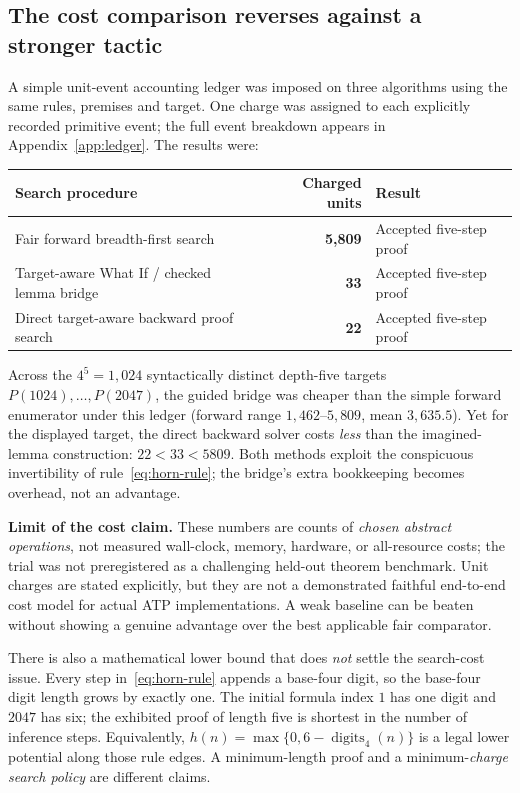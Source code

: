 \documentclass[11pt,letterpaper,oneside]{article}
\begin{document}
\subsection{The cost comparison reverses against a stronger tactic}
A simple unit-event accounting ledger was imposed on three algorithms using the same rules, premises and target. One charge was assigned to each explicitly recorded primitive event; the full event breakdown appears in Appendix~\ref{app:ledger}. The results were:
\begin{center}
\begin{tabularx}{.94\textwidth}{@{}Xr>{\raggedright\arraybackslash}p{2.2in}@{}}
\toprule
Search procedure & Charged units & Result\\\midrule
Fair forward breadth-first search & \textbf{5,809} & Accepted five-step proof\\
Target-aware What If / checked lemma bridge & \textbf{33} & Accepted five-step proof\\
Direct target-aware backward proof search & \textbf{22} & Accepted five-step proof\\\bottomrule
\end{tabularx}
\end{center}
Across the $4^5=1{,}024$ syntactically distinct depth-five targets $P(1024),\ldots,P(2047)$, the guided bridge was cheaper than the simple forward enumerator under this ledger (forward range $1{,}462$--$5{,}809$, mean $3{,}635.5$). Yet for the displayed target, the direct backward solver costs \emph{less} than the imagined-lemma construction: $22<33<5809$. Both methods exploit the conspicuous invertibility of rule~\eqref{eq:horn-rule}; the bridge's extra bookkeeping becomes overhead, not an advantage.

\begin{caution}
\textbf{Limit of the cost claim.} These numbers are counts of \emph{chosen abstract operations}, not measured wall-clock, memory, hardware, or all-resource costs; the trial was not preregistered as a challenging held-out theorem benchmark. Unit charges are stated explicitly, but they are not a demonstrated faithful end-to-end cost model for actual ATP implementations. A weak baseline can be beaten without showing a genuine advantage over the best applicable fair comparator.
\end{caution}

There is also a mathematical lower bound that does \emph{not} settle the search-cost issue. Every step in~\eqref{eq:horn-rule} appends a base-four digit, so the base-four digit length grows by exactly one. The initial formula index $1$ has one digit and $2047$ has six; the exhibited proof of length five is shortest in the number of inference steps. Equivalently, $h(n)=\max\{0,6-\operatorname{digits}_4(n)\}$ is a legal lower potential along those rule edges. A minimum-length proof and a minimum-\emph{charge search policy} are different claims.
\end{document}
